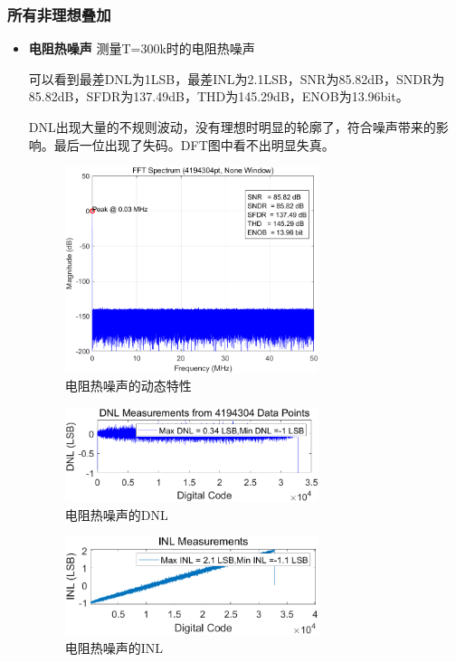 \documentclass[cs4size,a4paper]{ctexart}
\numberwithin{equation}{section}
\numberwithin{table}{section}
\numberwithin{figure}{section}
\begin{document}
\subsubsection{所有非理想叠加}

	\begin{itemize}

	\item \textbf{电阻热噪声} 测量T=300k时的电阻热噪声
		
		可以看到最差DNL为1LSB，最差INL为2.1LSB，SNR为85.82dB，SNDR为85.82dB，SFDR为137.49dB，THD为145.29dB，ENOB为13.96bit。

		DNL出现大量的不规则波动，没有理想时明显的轮廓了，符合噪声带来的影响。最后一位出现了失码。DFT图中看不出明显失真。
		\begin{figure}[H]
			\centering
			\includegraphics[width=0.7\textwidth]{pic/KT/DFT.png}
			\caption{电阻热噪声的动态特性} 
		\end{figure}

		\begin{figure}[H]
			\centering
			\includegraphics[width=0.7\textwidth]{pic/KT/DNL.png}
			\caption{电阻热噪声的DNL} 
		\end{figure}

		\begin{figure}[H]
			\centering
			\includegraphics[width=0.7\textwidth]{pic/KT/INL.png}
			\caption{电阻热噪声的INL} 
		\end{figure}


\end{itemize}
\end{document}
